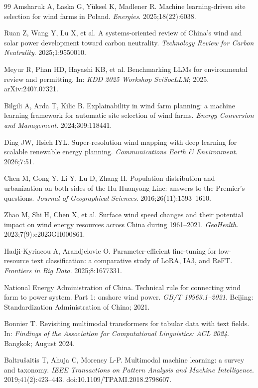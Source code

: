 \documentclass[12pt, a4paper]{article}
\begin{document}
\begin{thebibliography}{99}
Amsharuk A, \L aska G, Y\"{u}ksel K, Madlener R.
Machine learning-driven site selection for wind farms in Poland.
\textit{Energies}.
2025;18(22):6038.

Ruan Z, Wang Y, Lu X, et al.
A systems-oriented review of China's wind and solar power
development toward carbon neutrality.
\textit{Technology Review for Carbon Neutrality}.
2025;1:9550010.

Meyur R, Phan HD, Hayashi KB, et al.
Benchmarking LLMs for environmental review and permitting.
In: \textit{KDD 2025 Workshop SciSocLLM}; 2025.
arXiv:2407.07321.

Bilgili A, Arda T, Kilic B.
Explainability in wind farm planning: a machine learning
framework for automatic site selection of wind farms.
\textit{Energy Conversion and Management}.
2024;309:118441.

Ding JW, Hsieh IYL.
Super-resolution wind mapping with deep learning for scalable
renewable energy planning.
\textit{Communications Earth \& Environment}.
2026;7:51.

Chen M, Gong Y, Li Y, Lu D, Zhang H.
Population distribution and urbanization on both sides of the
Hu Huanyong Line: answers to the Premier's questions.
\textit{Journal of Geographical Sciences}.
2016;26(11):1593--1610.

Zhao M, Shi H, Chen X, et al.
Surface wind speed changes and their potential impact on wind
energy resources across China during 1961--2021.
\textit{GeoHealth}.
2023;7(9):e2023GH000861.

Hadji-Kyriacou A, Arandjelovic O.
Parameter-efficient fine-tuning for low-resource text
classification: a comparative study of LoRA, IA3, and ReFT.
\textit{Frontiers in Big Data}.
2025;8:1677331.

National Energy Administration of China.
Technical rule for connecting wind farm to power system.
Part 1: onshore wind power.
\textit{GB/T 19963.1--2021}.
Beijing: Standardization Administration of China; 2021.

Bonnier T.
Revisiting multimodal transformers for tabular data with
text fields.
In: \textit{Findings of the Association for Computational
Linguistics: ACL 2024}.
Bangkok; August 2024.

Baltrušaitis T, Ahuja C, Morency L-P.
Multimodal machine learning: a survey and taxonomy.
\textit{IEEE Transactions on Pattern Analysis and Machine
Intelligence}. 2019;41(2):423--443.
doi:10.1109/TPAMI.2018.2798607.


\end{thebibliography}
\end{document}

